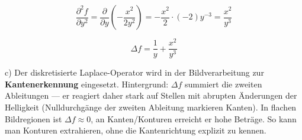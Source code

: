\documentclass[11pt, a4paper]{article}
\begin{document}
\[
\frac{\partial^2 f}{\partial y^2} = \frac{\partial}{\partial y}\left(-\frac{x^2}{2y^2}\right) = -\frac{x^2}{2}\cdot(-2)y^{-3} = \frac{x^2}{y^3}
\]

\[
\Delta f = \frac{1}{y} + \frac{x^2}{y^3}
\]


c) Der diskretisierte Laplace-Operator wird in der Bildverarbeitung zur \textbf{Kantenerkennung} eingesetzt. Hintergrund: $\Delta f$ summiert die zweiten Ableitungen — er reagiert daher stark auf Stellen mit abrupten Änderungen der Helligkeit (Nulldurchgänge der zweiten Ableitung markieren Kanten). In flachen Bildregionen ist $\Delta f \approx 0$, an Kanten/Konturen erreicht er hohe Beträge. So kann man Konturen extrahieren, ohne die Kantenrichtung explizit zu kennen.





\end{document}
